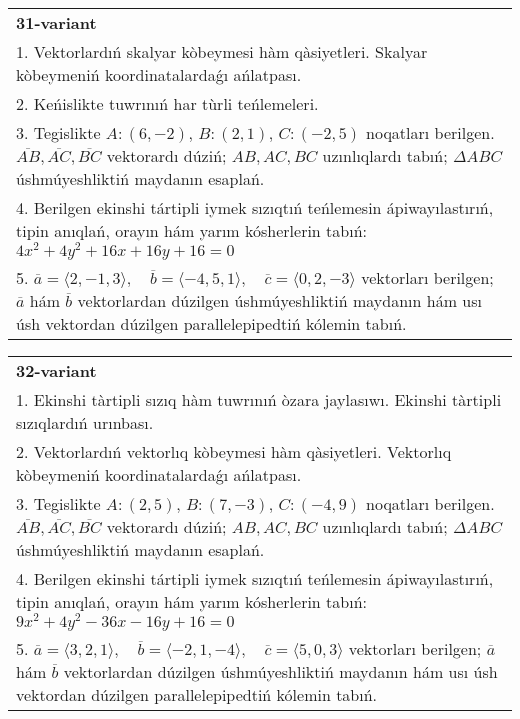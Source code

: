 \documentclass{article}
\begin{document}
\begin{tabular}{m{17cm}}
\textbf{31-variant}\\
1. Vektorlardıń skalyar kòbeymesi hàm qàsiyetleri. Skalyar kòbeymeniń koordinatalardaǵı ańlatpası.\\

2. Keńislikte tuwrınıń har tùrli teńlemeleri. \\

3. Tegislikte $A: (6, -2)$, $B: (2, 1)$, $C: (-2, 5)$ noqatları berilgen. $\overline{AB}, \overline{AC}, \overline{BC}$ vektorardı dúziń; $AB, AC, BC$ uzınlıqlardı tabıń; $\Delta ABC$ úshmúyeshliktiń maydanın esaplań. \\

4. Berilgen ekinshi tártipli iymek sızıqtıń teńlemesin ápiwayılastırıń, tipin anıqlań, orayın hám yarım kósherlerin tabıń: $4x^2+4y^2+16x+16y+16=0$\\

5. \(\overline{a} = \langle 2, -1, 3 \rangle, \quad \overline{b} = \langle -4, 5, 1 \rangle, \quad \overline{c} = \langle 0, 2, -3 \rangle\) vektorları berilgen; \(\overline{a}\) hám \(\overline{b}\) vektorlardan dúzilgen úshmúyeshliktiń maydanın hám usı úsh vektordan dúzilgen parallelepipedtiń kólemin tabıń.
\end{tabular}
\vspace{1cm}


\begin{tabular}{m{17cm}}
\textbf{32-variant}\\
1. Ekinshi tàrtipli sızıq hàm tuwrınıń òzara jaylasıwı. Ekinshi tàrtipli sızıqlardıń urınbası.\\

2. Vektorlardıń vektorlıq kòbeymesi hàm qàsiyetleri. Vektorlıq kòbeymeniń koordinatalardaǵı ańlatpası. \\

3. Tegislikte $A: (2, 5)$, $B: (7, -3)$, $C: (-4, 9)$ noqatları berilgen. $\overline{AB}, \overline{AC}, \overline{BC}$ vektorardı dúziń; $AB, AC, BC$ uzınlıqlardı tabıń; $\Delta ABC$ úshmúyeshliktiń maydanın esaplań. \\

4. Berilgen ekinshi tártipli iymek sızıqtıń teńlemesin ápiwayılastırıń, tipin anıqlań, orayın hám yarım kósherlerin tabıń: $9x^2+4y^2-36x-16y+16=0$\\

5. \(\overline{a} = \langle 3, 2, 1 \rangle, \quad \overline{b} = \langle -2, 1, -4 \rangle, \quad \overline{c} = \langle 5, 0, 3 \rangle\) vektorları berilgen; \(\overline{a}\) hám \(\overline{b}\) vektorlardan dúzilgen úshmúyeshliktiń maydanın hám usı úsh vektordan dúzilgen parallelepipedtiń kólemin tabıń.
\end{tabular}
\vspace{1cm}
\end{document}
